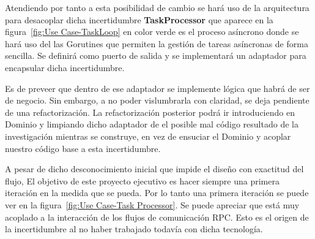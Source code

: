 \begin{itemize}
    Atendiendo por tanto a esta posibilidad de cambio se hará uso de la arquitectura para desacoplar dicha incertidumbre \textbf{TaskProcessor} que aparece en la figura~\cref{fig:Use Case-TaskLoop} en color verde es el proceso asíncrono donde se hará uso del las Gorutines que permiten la gestión de tareas asíncronas de forma sencilla.
    Se definirá como puerto de salida y se implementará un adaptador para encapsular dicha incertidumbre.

    Es de preveer que dentro de ese adaptador se implemente lógica que habrá de ser de negocio.
    Sin embargo, a no poder vislumbrarla con claridad, se deja pendiente de una refactorización.
    La refactorización posterior podrá ir introduciendo en Dominio y limpiando dicho adaptador de el posible mal código resultado de la investigación mientras se construye, en vez de ensuciar el Dominio y acoplar nuestro código base a esta incertidumbre.

    A pesar de dicho desconocimiento inicial que impide el diseño con exactitud del flujo, El objetivo de este proyecto ejecutivo es hacer siempre una primera iteración en la medida que se pueda.
    Por lo tanto una primera iteración se puede ver en la figura~\cref{fig:Use Case-Task Processor}.
    Se puede apreciar que está muy acoplado a la interacción de los flujos de comunicación RPC. Esto es el origen de la incertidumbre al no haber trabajado todavía con dicha tecnología.


\end{itemize}
